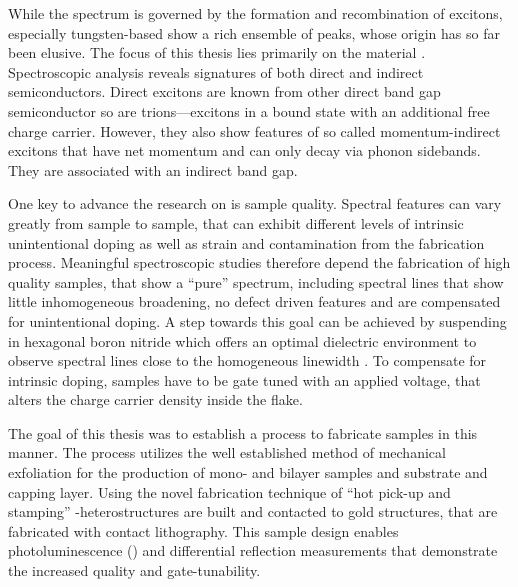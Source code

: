 While the spectrum is governed by the formation and recombination of excitons, especially tungsten-based \tmds show a rich ensemble of peaks, whose origin has so far been elusive. The focus of this thesis lies primarily on the material \wse\!\!. Spectroscopic analysis reveals signatures of both direct and indirect semiconductors. Direct excitons are known from other direct band gap semiconductor so are trions---excitons in a bound state with an additional free charge carrier. However, they also show features of so called momentum-indirect excitons that have net momentum and can only decay via phonon sidebands. They are associated with an indirect band gap.

One key to advance the research on \tmds is sample quality. Spectral features can vary greatly from sample to sample, that can exhibit different levels of intrinsic unintentional doping as well as strain and contamination from the fabrication process. Meaningful spectroscopic studies therefore depend the fabrication of high quality samples, that show a ``pure'' spectrum, including spectral lines that show little inhomogeneous broadening, no defect driven features and are compensated for unintentional doping. A step towards this goal can be achieved by suspending \tmds in hexagonal boron nitride which offers an optimal dielectric environment to observe spectral lines close to the homogeneous linewidth \cite{dean_boron_2010,cadiz_excitonic_2017}. To compensate for intrinsic doping, samples have to be gate tuned with an applied voltage, that alters the charge carrier density inside the flake.

The goal of this thesis was to establish a process to fabricate samples in this manner. The process utilizes the well established method of mechanical exfoliation for the production of \tmdg mono- and bilayer samples and \hbng substrate and capping layer. Using the novel fabrication technique of ``hot pick-up and stamping'' \cite{pizzocchero_hot_2016, tien_study_2016} \hbn-\tmdg heterostructures are built and contacted to gold structures, that are fabricated with contact lithography. This sample design enables photoluminescence (\pl\!) and differential reflection measurements that demonstrate the increased quality and gate-tunability.

